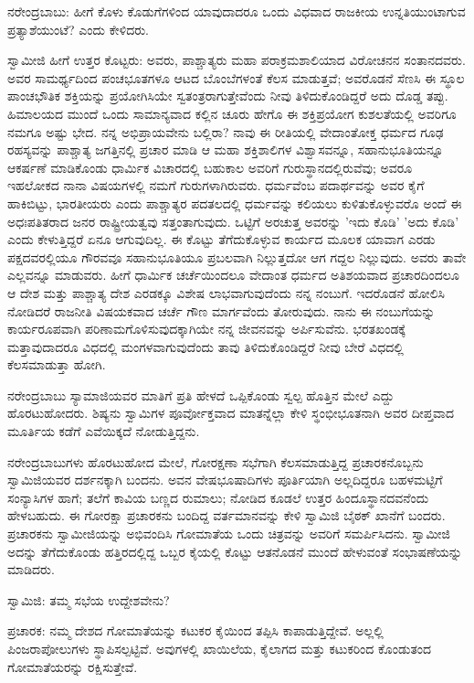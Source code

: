 ನರೇಂದ್ರಬಾಬು: ಹೀಗೆ ಕೊಳು ಕೊಡುಗೆಗಳಿಂದ ಯಾವುದಾದರೂ ಒಂದು ವಿಧವಾದ ರಾಜಕೀಯ ಉನ್ನತಿಯುಂಟಾಗುವ ಪ್ರತ್ಯಾಶೆಯುಂಟೆ? ಎಂದು ಕೇಳಿದರು.

ಸ್ವಾಮೀಜಿ ಹೀಗೆ ಉತ್ತರ ಕೊಟ್ಟರು: ಅವರು, ಪಾಶ್ಚಾತ್ಯರು ಮಹಾ ಪರಾಕ್ರಮಶಾಲಿಯಾದ ವಿರೋಚನನ ಸಂತಾನದವರು. ಅವರ ಸಾಮರ್ಥ್ಯದಿಂದ ಪಂಚಭೂತಗಳೂ ಆಟದ ಬೊಂಬೆಗಳಂತೆ ಕೆಲಸ ಮಾಡುತ್ತವೆ; ಅವರೊಡನೆ ಸೆಣಸಿ ಈ ಸ್ಥೂಲ ಪಾಂಚಭೌತಿಕ ಶಕ್ತಿಯನ್ನು ಪ್ರಯೋಗಿಸಿಯೇ ಸ್ವತಂತ್ರರಾಗುತ್ತೇವೆಂದು ನೀವು ತಿಳಿದುಕೊಂಡಿದ್ದರೆ ಅದು ದೊಡ್ಡ ತಪ್ಪು. ಹಿಮಾಲಯದ ಮುಂದೆ ಒಂದು ಸಾಮಾನ್ಯವಾದ ಕಲ್ಲಿನ ಚೂರು ಹೇಗೊ ಈ ಶಕ್ತಿಪ್ರಯೋಗ ಕುಶಲತೆಯಲ್ಲಿ ಅವರಿಗೂ ನಮಗೂ ಅಷ್ಟು ಭೇದ. ನನ್ನ ಅಭಿಪ್ರಾಯವೇನು ಬಲ್ಲಿರಾ? ನಾವು ಈ ರೀತಿಯಲ್ಲಿ ವೇದಾಂತೋಕ್ತ ಧರ್ಮದ ಗೂಢ ರಹಸ್ಯವನ್ನು ಪಾಶ್ಚಾತ್ಯ ಜಗತ್ತಿನಲ್ಲಿ ಪ್ರಚಾರ ಮಾಡಿ ಆ ಮಹಾ ಶಕ್ತಿಶಾಲಿಗಳ ವಿಶ್ವಾಸವನ್ನೂ, ಸಹಾನುಭೂತಿಯನ್ನೂ ಆಕರ್ಷಣೆ ಮಾಡಿಕೊಂಡು ಧಾರ್ಮಿಕ ವಿಚಾರದಲ್ಲಿ ಬಹುಕಾಲ ಅವರಿಗೆ ಗುರುಸ್ಥಾನದಲ್ಲಿರುವೆವು; ಅವರೂ ಇಹಲೋಕದ ನಾನಾ ವಿಷಯಗಳಲ್ಲಿ ನಮಗೆ ಗುರುಗಳಾಗಿರುವರು. ಧರ್ಮವೆಂಬ ಪದಾರ್ಥವನ್ನು ಅವರ ಕೈಗೆ ಹಾಕಿಬಿಟ್ಟು, ಭಾರತೀಯರು ಎಂದು ಪಾಶ್ಚಾತ್ಯರ ಪದತಲದಲ್ಲಿ ಧರ್ಮವನ್ನು ಕಲಿಯಲು ಕುಳಿತುಕೊಳ್ಳುವರೊ ಅಂದೆ ಈ ಅಧಃಪತಿತರಾದ ಜನರ ರಾಷ್ಟ್ರೀಯತ್ವವು ಸತ್ತಂತಾಗುವುದು. ಒಟ್ಟಿಗೆ ಅರಚುತ್ತ ಅವರನ್ನು 'ಇದು ಕೊಡಿ' 'ಅದು ಕೊಡಿ' ಎಂದು ಕೇಳುತ್ತಿದ್ದರೆ ಏನೂ ಆಗುವುದಿಲ್ಲ. ಈ ಕೊಟ್ಟು ತೆಗೆದುಕೊಳ್ಳುವ ಕಾರ್ಯದ ಮೂಲಕ ಯಾವಾಗ ಎರಡು ಪಕ್ಷದವರಲ್ಲಿಯೂ ಗೌರವವೂ ಸಹಾನುಭೂತಿಯೂ ಪ್ರಬಲವಾಗಿ ನಿಲ್ಲುತ್ತದೋ ಆಗ ಗದ್ದಲ ನಿಲ್ಲುವುದು. ಅವರು ತಾವೇ ಎಲ್ಲವನ್ನೂ ಮಾಡುವರು. ಹೀಗೆ ಧಾರ್ಮಿಕ ಚರ್ಚೆಯಿಂದಲೂ ವೇದಾಂತ ಧರ್ಮದ ಅತಿಶಯವಾದ ಪ್ರಚಾರದಿಂದಲೂ ಆ ದೇಶ ಮತ್ತು ಪಾಶ್ಚಾತ್ಯ ದೇಶ ಎರಡಕ್ಕೂ ವಿಶೇಷ ಲಾಭವಾಗುವುದೆಂದು ನನ್ನ ನಂಬುಗೆ. ಇದರೊಡನೆ ಹೋಲಿಸಿ ನೋಡಿದರೆ ರಾಜನೀತಿ ವಿಷಯಕವಾದ ಚರ್ಚೆ ಗೌಣ ಮಾರ್ಗವೆಂದು ತೋರುವುದು. ನಾನು ಈ ನಂಬುಗೆಯನ್ನು ಕಾರ್ಯರೂಪವಾಗಿ ಪರಿಣಾಮಗೊಳಿಸುವುದಕ್ಕಾಗಿಯೇ ನನ್ನ ಜೀವನವನ್ನು ಅರ್ಪಿಸುವೆನು. ಭರತಖಂಡಕ್ಕೆ ಮತ್ತಾವುದಾದರೂ ವಿಧದಲ್ಲಿ ಮಂಗಳವಾಗುವುದೆಂದು ತಾವು ತಿಳಿದುಕೊಂಡಿದ್ದರೆ ನೀವು ಬೇರೆ ವಿಧದಲ್ಲಿ ಕೆಲಸಮಾಡುತ್ತಾ ಹೋಗಿ.

ನರೇಂದ್ರಬಾಬು ಸ್ಯಾಮಾಜಿಯವರ ಮಾತಿಗೆ ಪ್ರತಿ ಹೇಳದೆ ಒಪ್ಪಿಕೊಂಡು ಸ್ವಲ್ಪ ಹೊತ್ತಿನ ಮೇಲೆ ಎದ್ದು ಹೊರಟುಹೋದರು. ಶಿಷ್ಯನು ಸ್ವಾಮಿಗಳ ಪೂರ್ವೋಕ್ತವಾದ ಮಾತನ್ನೆಲ್ಲಾ ಕೇಳಿ ಸ್ಥಂಭೀಭೂತನಾಗಿ ಅವರ ದೀಪ್ತವಾದ ಮೂರ್ತಿಯ ಕಡೆಗೆ ಎವೆಯಿಕ್ಕದೆ ನೋಡುತ್ತಿದ್ದನು.

ನರೇಂದ್ರಬಾಬುಗಳು ಹೊರಟುಹೋದ ಮೇಲೆ, ಗೋರಕ್ಷಣಾ ಸಭೆಗಾಗಿ ಕೆಲಸಮಾಡುತ್ತಿದ್ದ ಪ್ರಚಾರಕನೊಬ್ಬನು ಸ್ವಾಮಿಜಿಯವರ ದರ್ಶನಕ್ಕಾಗಿ ಬಂದನು. ಅವನ ವೇಷಭೂಷಾದಿಗಳು ಪೂರ್ತಿಯಾಗಿ ಅಲ್ಲದಿದ್ದರೂ ಬಹಳಮಟ್ಟಿಗೆ ಸಂನ್ಯಾಸಿಗಳ ಹಾಗೆ; ತಲೆಗೆ ಕಾವಿಯ ಬಣ್ಣದ ರುಮಾಲು; ನೋಡಿದ ಕೂಡಲೆ ಉತ್ತರ ಹಿಂದೂಸ್ಥಾನದವನೆಂದು ಹೇಳಬಹುದು. ಈ ಗೋರಕ್ಷಾ ಪ್ರಚಾರಕನು ಬಂದಿದ್ದ ವರ್ತಮಾನವನ್ನು ಕೇಳಿ ಸ್ವಾಮಿಜಿ ಬೈಠಕ್ ಖಾನೆಗೆ ಬಂದರು. ಪ್ರಚಾರಕನು ಸ್ವಾಮೀಜಿಯನ್ನು ಅಭಿವಂದಿಸಿ ಗೋಮಾತೆಯ ಒಂದು ಚಿತ್ರವನ್ನು ಅವರಿಗೆ ಸಮರ್ಪಿಸಿದನು. ಸ್ವಾಮೀಜಿ ಅದನ್ನು ತೆಗೆದುಕೊಂಡು ಹತ್ತಿರದಲ್ಲಿದ್ದ ಒಬ್ಬರ ಕೈಯಲ್ಲಿ ಕೊಟ್ಟು ಆತನೊಡನೆ ಮುಂದೆ ಹೇಳುವಂತೆ ಸಂಭಾಷಣೆಯನ್ನು ಮಾಡಿದರು.

ಸ್ವಾಮಿಜಿ: ತಮ್ಮ ಸಭೆಯ ಉದ್ದೇಶವೇನು?

ಪ್ರಚಾರಕ: ನಮ್ಮ ದೇಶದ ಗೋಮಾತೆಯನ್ನು ಕಟುಕರ ಕೈಯಿಂದ ತಪ್ಪಿಸಿ ಕಾಪಾಡುತ್ತಿದ್ದೇವೆ. ಅಲ್ಲಲ್ಲಿ ಪಿಂಜರಾಪೋಲುಗಳು ಸ್ಥಾಪಿಸಲ್ಪಟ್ಟಿವೆ. ಅವುಗಳಲ್ಲಿ ಖಾಯಿಲೆಯ, ಕೈಲಾಗದ ಮತ್ತು ಕಟುಕರಿಂದ ಕೊಂಡುತಂದ ಗೋಮಾತೆಯರನ್ನು ರಕ್ಷಿಸುತ್ತೇವೆ.

